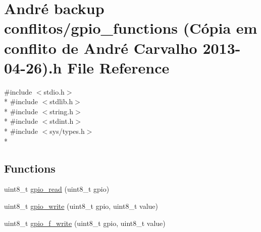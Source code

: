 \hypertarget{gpio__functions_01_07C_xC3_xB3pia_01em_01conflito_01de_01Andr_xC3_xA9_01Carvalho_012013-04-26_08_8h}{\section{André backup conflitos/gpio\-\_\-functions (Cópia em conflito de André Carvalho 2013-\/04-\/26).h File Reference}
\label{gpio__functions_01_07C_xC3_xB3pia_01em_01conflito_01de_01Andr_xC3_xA9_01Carvalho_012013-04-26_08_8h}
}
{\ttfamily \#include $<$stdio.\-h$>$}\\*
{\ttfamily \#include $<$stdlib.\-h$>$}\\*
{\ttfamily \#include $<$string.\-h$>$}\\*
{\ttfamily \#include $<$stdint.\-h$>$}\\*
{\ttfamily \#include $<$sys/types.\-h$>$}\\*
\subsection*{Functions}
\begin{DoxyCompactItemize}
\item 
uint8\-\_\-t \hyperlink{gpio__functions_01_07C_xC3_xB3pia_01em_01conflito_01de_01Andr_xC3_xA9_01Carvalho_012013-04-26_08_8h_a267fb0bb66584f91d79ef9e1dc75c997}{gpio\-\_\-read} (uint8\-\_\-t gpio)
\item 
uint8\-\_\-t \hyperlink{gpio__functions_01_07C_xC3_xB3pia_01em_01conflito_01de_01Andr_xC3_xA9_01Carvalho_012013-04-26_08_8h_a9e6c28fef76e43333120a91d47d44f9f}{gpio\-\_\-write} (uint8\-\_\-t gpio, uint8\-\_\-t value)
\item 
uint8\-\_\-t \hyperlink{gpio__functions_01_07C_xC3_xB3pia_01em_01conflito_01de_01Andr_xC3_xA9_01Carvalho_012013-04-26_08_8h_a5ba85b445f40e170abf99251cae63ef2}{gpio\-\_\-f\-\_\-write} (uint8\-\_\-t gpio, uint8\-\_\-t value)
\end{DoxyCompactItemize}


